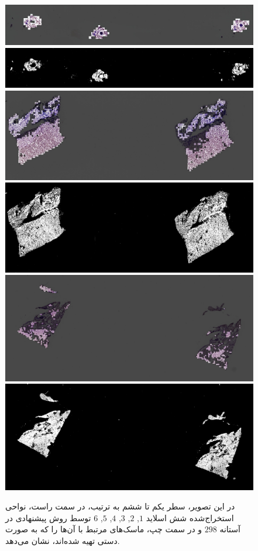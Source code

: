 \begin{enumerate}
\begin{figure}
\begin{center}
            \vspace{0.05cm}
            \includegraphics[width=0.48\linewidth]{figs/introduction/subs/challenges/evaluate_slides/TCGA-EL-A4K7-11A-01-TS1.C08B59AA-87DF-4ABB-8B70-25FEF9893C7F__70_generated_mask.jpg}
            \includegraphics[width=0.48\linewidth]{figs/introduction/subs/challenges/evaluate_slides/TCGA-EL-A4K7-11A-01-TS1.C08B59AA-87DF-4ABB-8B70-25FEF9893C7F__70_masked.png}
            \vspace{0.05cm}
            \includegraphics[width=0.48\linewidth]{figs/introduction/subs/challenges/evaluate_slides/TCGA-ET-A39N-01A-01-TSA.C38FCE19-9558-4035-9F0B-AD05B9BE321D___198_generated_mask.jpg}
            \includegraphics[width=0.48\linewidth]{figs/introduction/subs/challenges/evaluate_slides/TCGA-ET-A39N-01A-01-TSA.C38FCE19-9558-4035-9F0B-AD05B9BE321D___198_masked.png}
            \vspace{0.05cm}
            \includegraphics[width=0.48\linewidth]{figs/introduction/subs/challenges/evaluate_slides/TCGA-BJ-A3F0-01A-01-TSA.728CE583-95BE-462B-AFDF-FC0B228DF3DE__3_generated_mask.jpg}
            \includegraphics[width=0.48\linewidth]{figs/introduction/subs/challenges/evaluate_slides/TCGA-BJ-A3F0-01A-01-TSA.728CE583-95BE-462B-AFDF-FC0B228DF3DE__3_masked.png}
        \end{center}
        \caption[نواحی استخراج شده و ماسک‌های مرتبط]
        {در این تصویر، سطر یکم تا ششم به ترتیب، در سمت راست، نواحی استخراج‌شده شش اسلاید $1$, $2$, $3$, $4$, $5$, $6$ توسط روش پیشنهادی در آستانه $298$ و در سمت چپ، ماسک‌های مرتبط با آن‌ها را که به صورت دستی تهیه شده‌اند، نشان می‌دهد.}


\end{figure}
\end{enumerate}
